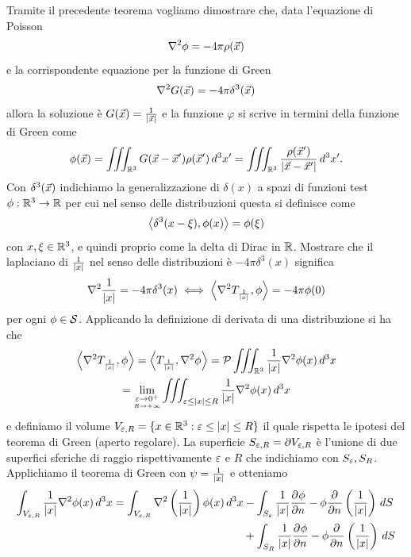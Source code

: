 Tramite il precedente teorema vogliamo dimostrare che, data l'equazione di Poisson 
\begin{align}
  \nabla^2\varphi = -4\pi \rho(\v{x})
\end{align}
e la corrispondente equazione per la funzione di Green
\begin{align}
  \nabla^2 G(\vec{x}) = -4\pi \delta^{3}(\vec{x})
\end{align}
allora la soluzione è $ G(\vec{x}) = \frac{1}{\left|{\vec{x}}\right|} $ e la funzione $ \varphi $ si scrive in termini della funzione di Green come 
\begin{align}
  \varphi(\v{x}) = \iiint_{\R^3} G(\v{x} - \v{x}') \rho(\v{x}') \,d^3x' = \iiint_{\R^3} \frac{\rho(\v{x}')}{\abs{\v{x} - \v{x}'}} \,d^3x'.
\end{align}
Con $ \delta^3(\vec{x}) $ indichiamo la generalizzazione di $ \delta(x) $ a spazi di funzioni test $ \phi:\R^3 \to \R $ per cui nel senso delle 
distribuzioni questa si definisce come 
\begin{align}
  \sca{\delta^3(x - \xi), \phi(x)} = \phi(\xi)
\end{align}
con $ x,\xi \in \mathbb{R}^3 $, e quindi proprio come la delta di Dirac in $ \mathbb{R} $. Mostrare che il laplaciano di $ \frac1{\left|{x}\right|} $ nel senso delle 
distribuzioni è $ -4\pi \delta^3(x) $ significa 
\begin{align}
  \nabla^2 \frac1{\abs{x}} = -4\pi \delta^3(x) \iff \sca{\nabla^2 T_{\frac1{\abs{x}}}, \phi} = -4\pi \phi(0) 
\end{align}
per ogni $ \phi \in \S $. Applicando la definizione di derivata di una distribuzione si ha che 
\begin{gather}
  \sca{\nabla^2 T_{\frac1{\abs{x}}}, \phi} = \sca{ T_{\frac1{\abs{x}}}, \nabla^2\phi} = \P \iiint_{\R^3} \frac1{\abs{x}} \nabla^2 \phi (x) \,d^3x
  \\
  = \lim_{\un{ \eps \to 0^+}{R \to +\infty}} \iiint_{\eps \leq \abs{x} \leq R} \frac1{\abs{x}} \nabla^2 \phi (x) \,d^3x
\end{gather}
e definiamo il volume $ V_{\varepsilon,R} = \{ x \in \mathbb{R}^3: \varepsilon \leq \left|{x}\right| \leq R \} $ il quale rispetta le ipotesi del teorema di Green (aperto regolare).
La superficie $ S_{\varepsilon,R} = \partial V_{\varepsilon,R} $ è l'unione di due superfici sferiche di raggio rispettivamente $ \varepsilon $ e $ R $ che indichiamo con 
$ S_\varepsilon, S_R $. Applichiamo il teorema di Green con $ \psi = \frac1{\left|{x}\right|} $ e otteniamo 
\begin{align}
  \int_{V_{\eps,R}} \frac1{\abs{x}} \nabla^2 \phi (x) \,d^3x 
  = \int_{V_{\eps,R}}\nabla^2\left( \frac1{\abs{x}} \right)  \phi (x) \,d^3x 
  &- \int_{S_\eps} \frac1{\abs{x}} \der{\phi}{{n}} - \phi \der{}{{n}}\left( \frac1{\abs{x}} \right) \,dS
  \\
  &+ \int_{S_R} \frac1{\abs{x}} \der{\phi}{{n}} - \phi \der{}{{n}}\left( \frac1{\abs{x}} \right) \,dS
\end{align}
